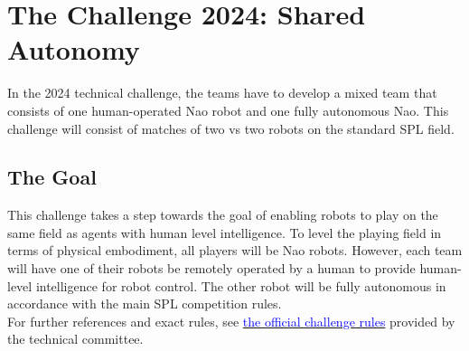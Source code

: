 \section{The Challenge 2024: Shared Autonomy}

In the 2024 technical challenge, the teams have to develop a mixed team that consists of one human-operated Nao robot and one fully autonomous Nao.
This challenge will consist of matches of two vs two robots on the standard SPL field. 

\subsection{The Goal}

This challenge takes a step towards the goal of enabling robots to play on the same field as agents with human level intelligence.
To level the playing field in terms of physical embodiment, all players will be Nao robots.
However, each team will have one of their robots be remotely operated by a human to provide human-level intelligence for robot control.
The other robot will be fully autonomous in accordance with the main SPL competition rules.\\

For further references and exact rules, see \href{https://spl.robocup.org/wp-content/uploads/SPL-Challenges-2024.pdf}{\textcolor{blue}{the official challenge rules}} provided by the technical committee.

